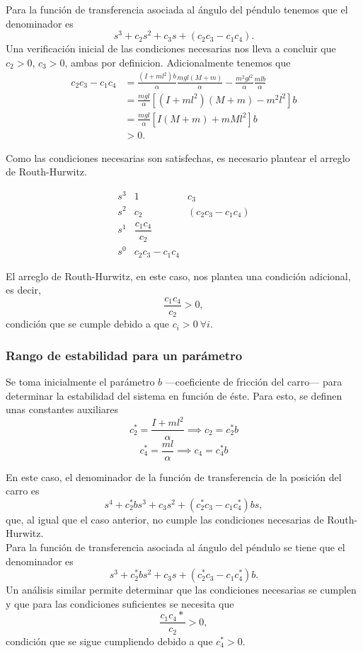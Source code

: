Para la función de transferencia asociada al ángulo del péndulo tenemos que el denominador es \[ s^3 + c_2 s^2 + c_3 s + (c_2 c_3 - c_1 c_4). \] Una verificación inicial de las condiciones necesarias nos lleva a concluir que $c_2 > 0$, $c_3 > 0$, ambas por definicion. Adicionalmente tenemos que
\begin{align*}
  c_2 c_3 - c_1 c_4
  &= \frac{(I + ml^2)b}{\alpha} \frac{mgl(M + m)}{\alpha} - \frac{m^2 g l^2}{\alpha} \frac{mlb}{\alpha}\\
  &= \frac{mgl}{\alpha} [(I + m l^2) (M + m) - m^2 l ^2] b\\
  &= \frac{mgl}{\alpha} [I(M + m) + m M l^2] b\\
  &> 0.
\end{align*}

Como las condiciones necesarias son satisfechas, es necesario plantear el arreglo de Routh-Hurwitz.

\[
  \begin{array}{c|cc}
    s^3 & 1 & c_3\\
    s^2 & c_2 & (c_2 c_3 - c_1 c_4)\\
    s^1 & \dfrac{c_1 c_4}{c_2} &\\
    s^0 & c_2 c_3 - c_1 c_4 &
  \end{array}
\]

El arreglo de Routh-Hurwitz, en este caso, nos plantea una condición adicional, es decir, \[ \frac{c_1 c_4}{c_2} > 0, \] condición que se cumple debido a que $c_i > 0 \ \forall i$.\\

\subsubsection{Rango de estabilidad para un parámetro}
Se toma inicialmente el parámetro $b$ ---coeficiente de fricción del carro--- para determinar la estabilidad del sistema en función de éste. Para esto, se definen unas constantes auxiliares
\[ c_2^* = \frac{I + m l^2}{\alpha} \implies c_2 = c_2^* b \]
\[ c_4^* = \frac{m l}{\alpha} \implies c_4 = c_4^* b \]

En este caso, el denominador de la función de transferencia de la posición del carro es \[ s^4 + c_2^* b s^3 + c_3 s^2 + (c_2^* c_3 - c_1 c_4^*) b s, \] que, al igual que el caso anterior, no cumple las condiciones necesarias de Routh-Hurwitz.\\

Para la función de transferencia asociada al ángulo del péndulo se tiene que el denominador es \[ s^3 + c_2^* b s^2 + c_3 s + (c_2^* c_3 - c_1 c_4^*) b. \] Un análisis similar permite determinar que las condiciones necesarias se cumplen y que para las condiciones suficientes se necesita que \[ \frac{c_1 c_4*}{c_2} > 0, \] condición que se sigue cumpliendo debido a que $c_4^* > 0$.\\

